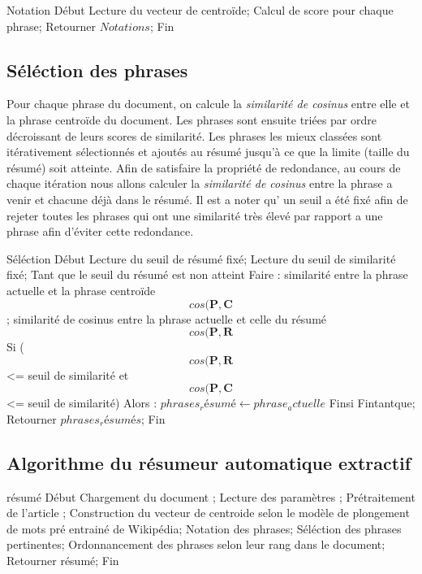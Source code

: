 \begin{algorithm}[H]
	\begin{algorithmic}[1]
		\STATE Notation
		\STATE Début
		\STATE Lecture du vecteur de centroïde;
		\STATE Calcul de score pour chaque phrase;
		\STATE \quad Retourner $Notations$;
		\STATE Fin
	\end{algorithmic}
\end{algorithm}


\subsection{Séléction des phrases}
Pour chaque phrase du document, on calcule la \emph{similarité de cosinus} entre elle et la phrase centroïde du document. Les phrases sont ensuite triées par ordre décroissant de leurs scores de similarité. Les phrases les mieux classées sont itérativement sélectionnés et ajoutés au résumé jusqu'à ce que la limite (taille du résumé) soit atteinte. Afin de satisfaire la propriété de redondance, au cours de chaque itération nous allons calculer la \emph{similarité de cosinus} entre la phrase a venir et chacune déjà dans le résumé.
Il est a noter qu' un seuil a été fixé afin de rejeter toutes les phrases qui ont une similarité très élevé par rapport a une phrase afin d'éviter cette redondance.

\begin{algorithm}[H]
	\begin{algorithmic}[1]
		\STATE Séléction
		\STATE Début
		\STATE Lecture du seuil de résumé fixé;
		\STATE Lecture du seuil de similarité fixé;
		\STATE Tant que le seuil du résumé est non atteint Faire :
		\STATE similarité entre la phrase actuelle et la phrase centroïde \gets \[cos(\pmb P, \pmb C\];
		\STATE similarité de cosinus entre la phrase actuelle et celle du résumé  \gets \[cos(\pmb P, \pmb R\]	
		\STATE Si (\[cos(\pmb P, \pmb R\] <= seuil de similarité et \[cos(\pmb P, \pmb C\] <= seuil de similarité) Alors :
		\STATE $phrases_résumé \gets phrase_actuelle$
		\STATE Finsi
		\STATE Fintantque;	
		\STATE \quad Retourner $phrases_résumés$;
		\STATE Fin
	\end{algorithmic}
\end{algorithm}

\subsection{Algorithme du résumeur automatique extractif}

\begin{algorithm}[H]
	\begin{algorithmic}[1]
\STATE résumé
\STATE Début
\STATE Chargement du document ;
\STATE Lecture des paramètres ;
\STATE Prétraitement de l'article ;
\STATE Construction du vecteur de centroide selon le modèle de plongement de mots pré entrainé de Wikipédia;
\STATE Notation des phrases;
\STATE Séléction des phrases pertinentes;
\STATE Ordonnancement des phrases selon leur rang dans le document;
\STATE \quad Retourner résumé;
\STATE Fin 
   \end{algorithmic}
\end{algorithm}


